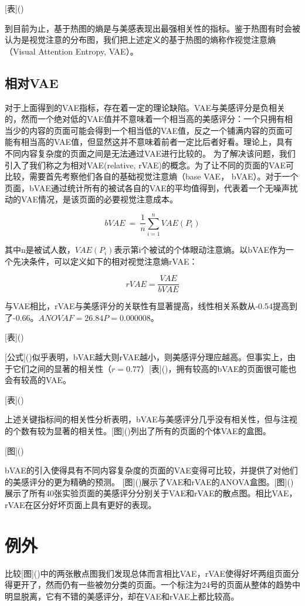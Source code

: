 [表]()

到目前为止，基于热图的熵是与美感表现出最强相关性的指标。鉴于热图有时会被认为是视觉注意的分布图，我们把上述定义的基于热图的熵称作视觉注意熵（Visual Attention Entropy, VAE）。


\subsection{相对VAE}
对于上面得到的VAE指标，存在着一定的理论缺陷。VAE与美感评分是负相关的，然而一个绝对低的VAE值并不意味着一个相当高的美感评分：一个只拥有相当少的内容的页面可能会得到一个相当低的VAE值，反之一个铺满内容的页面可能有相当高的VAE值，但显然这并不意味着前者一定比后者好看。理论上，具有不同内容复杂度的页面之间是无法通过VAE进行比较的。
为了解决该问题，我们引入了我们称之为相对VAE(relative, rVAE)的概念。为了让不同的页面的VAE可比较，需要首先考察他们各自的基础视觉注意熵（base VAE， bVAE）。对于一个页面，bVAE通过统计所有的被试各自的VAE的平均值得到，代表着一个无噪声扰动的VAE情况，是该页面的必要视觉注意成本。

$$bVAE~=~\frac{1}{n}\sum_{i=1}^n VAE(P_i)$$

其中n是被试人数，$VAE(P_i)$表示第i个被试的个体眼动注意熵。以bVAE作为一个先决条件，可以定义如下的相对视觉注意熵rVAE：

\begin{equation}
rVAE = \frac{VAE}{bVAE}
\label{formula:rvae}
\end{equation}

与VAE相比，rVAE与美感评分的关联性有显著提高，线性相关系数从-0.54提高到了-0.66。$ANOVA F = 26.84 P = 0.000008$。

[表]()

[公式]()似乎表明，bVAE越大则rVAE越小，则美感评分理应越高。但事实上，由于它们之间的显著的相关性（$r = 0.77$）[表]()，拥有较高的bVAE的页面很可能也会有较高的VAE。

[表]()

上述关键指标间的相关性分析表明，bVAE与美感评分几乎没有相关性，但与注视的个数有较为显著的相关性。[图]()列出了所有的页面的个体VAE的盒图。

[图]()

bVAE的引入使得具有不同内容复杂度的页面的VAE变得可比较，并提供了对他们的美感评分的更为精确的预测。
[图]()展示了VAE和rVAE的ANOVA盒图。[图]()展示了所有40张实验页面的美感评分分别关于VAE和rVAE的散点图。相比VAE，rVAE在区分好坏页面上具有更好的表现。

\section{例外}
比较[图]()中的两张散点图我们发现总体而言相比VAE，rVAE使得好坏两组页面分得更开了，然而仍有一些被勿分类的页面。一个标注为24号的页面从整体的趋势中明显脱离，它有不错的美感评分，却在VAE和rVAE上都比较高。

